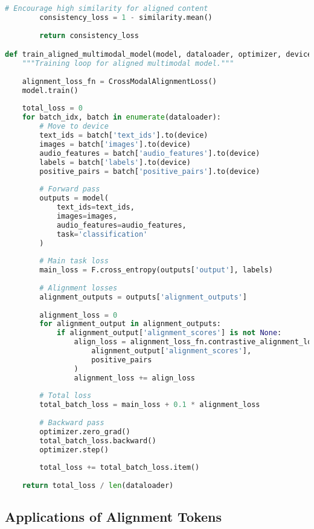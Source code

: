 \begin{lstlisting}[language=Python, caption=Cross-modal alignment training objectives]
        # Encourage high similarity for aligned content
        consistency_loss = 1 - similarity.mean()
        
        return consistency_loss

def train_aligned_multimodal_model(model, dataloader, optimizer, device):
    """Training loop for aligned multimodal model."""
    
    alignment_loss_fn = CrossModalAlignmentLoss()
    model.train()
    
    total_loss = 0
    for batch_idx, batch in enumerate(dataloader):
        # Move to device
        text_ids = batch['text_ids'].to(device)
        images = batch['images'].to(device)
        audio_features = batch['audio_features'].to(device)
        labels = batch['labels'].to(device)
        positive_pairs = batch['positive_pairs'].to(device)
        
        # Forward pass
        outputs = model(
            text_ids=text_ids,
            images=images,
            audio_features=audio_features,
            task='classification'
        )
        
        # Main task loss
        main_loss = F.cross_entropy(outputs['output'], labels)
        
        # Alignment losses
        alignment_outputs = outputs['alignment_outputs']
        
        alignment_loss = 0
        for alignment_output in alignment_outputs:
            if alignment_output['alignment_scores'] is not None:
                align_loss = alignment_loss_fn.contrastive_alignment_loss(
                    alignment_output['alignment_scores'],
                    positive_pairs
                )
                alignment_loss += align_loss
        
        # Total loss
        total_batch_loss = main_loss + 0.1 * alignment_loss
        
        # Backward pass
        optimizer.zero_grad()
        total_batch_loss.backward()
        optimizer.step()
        
        total_loss += total_batch_loss.item()
    
    return total_loss / len(dataloader)
\end{lstlisting}

\subsection{Applications of Alignment Tokens}

